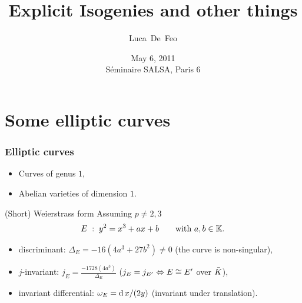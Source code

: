\documentclass[10pt]{beamer}
\title{Explicit Isogenies and other things}
\author{Luca~De~Feo}
\institute[IRMAR]{IRMAR, Université de Rennes 1}
\date[May 6, 2011]{May 6, 2011\\Séminaire SALSA, Paris 6}
\begin{document}
\begin{frame}
  \titlepage
\end{frame}


\section{Some elliptic curves}

\begin{frame}
  \frametitle{Elliptic curves}

  \begin{itemize}
  \item Curves of genus $1$,
  \item Abelian varieties of dimension $1$.
  \end{itemize}
  
  \begin{block}{(Short) Weierstrass form}
    Assuming $p\ne2,3$
    {\large
      \begin{equation*}
        E\;:\;y^2 = x^3 + ax + b\qquad\text{with $a,b\in\mathbb{K}$.}
      \end{equation*}
    }
    \begin{itemize}
    \item discriminant: \alert{$\Delta_E = -16(4a^3 + 27b^2) \ne 0$} (the curve is non-singular),
    \item $j$-invariant: \alert{$j_E=\frac{-1728(4a^3)}{\Delta_E}$}
      ($j_E=j_{E'} \Leftrightarrow E\cong E'$ over $\bar{K}$),
    \item invariant differential: \alert{$\omega_E= \operatorname{d} x/(2y)$} (invariant under translation).
    \end{itemize}
  \end{block}
\end{frame}


\end{document}

